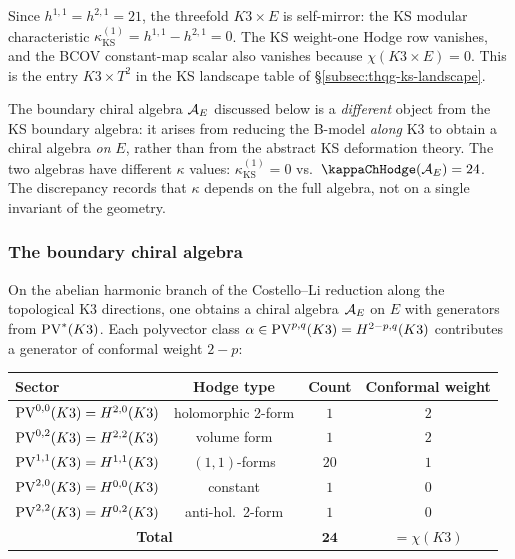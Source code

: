 \begin{remark}[Self-mirror with $\kappa_{\mathrm{KS}}^{(1)} = 0$]
\label{rem:k3e-self-mirror}
Since $h^{1,1} = h^{2,1} = 21$, the threefold $K3 \times E$
is self-mirror: the KS modular characteristic
$\kappa_{\mathrm{KS}}^{(1)} = h^{1,1} - h^{2,1} = 0$.
The KS weight-one Hodge row vanishes, and the BCOV constant-map
scalar also vanishes because $\chi(K3\times E)=0$. This is the entry
$K3 \times T^2$ in the KS landscape table of
\S\ref*{subsec:thqg-ks-landscape}.

The boundary chiral algebra $\mathcal{A}_E$ discussed below is a
\emph{different} object from the KS boundary algebra: it arises
from reducing the B-model \emph{along} K3 to obtain a chiral
algebra \emph{on} $E$, rather than from the abstract KS
deformation theory. The two algebras have different $\kappa$
values: $\kappa_{\mathrm{KS}}^{(1)} = 0$ vs.\
$\kappaChHodge(\cA_E) = 24$. The discrepancy records that
$\kappa$ depends on the full algebra, not on a single
invariant of the geometry.
\end{remark}


\subsubsection{The boundary chiral algebra}
\label{subsubsec:k3e-boundary}

On the abelian harmonic branch of the Costello--Li reduction along the
topological K3 directions, one obtains a chiral algebra $\mathcal{A}_E$ on $E$
with generators from $\operatorname{PV}^*(K3)$. Each polyvector class
$\alpha \in \operatorname{PV}^{p,q}(K3) = H^{2-p,q}(K3)$ contributes a generator of
conformal weight $2 - p$:

\begin{center}
\renewcommand{\arraystretch}{1.2}
\small
\begin{tabular}{lccc}
\textbf{Sector} & \textbf{Hodge type} & \textbf{Count}
 & \textbf{Conformal weight} \\
\hline
$\operatorname{PV}^{0,0}(K3) = H^{2,0}(K3)$ & holomorphic 2-form & $1$ & $2$ \\
$\operatorname{PV}^{0,2}(K3) = H^{2,2}(K3)$ & volume form & $1$ & $2$ \\
$\operatorname{PV}^{1,1}(K3) = H^{1,1}(K3)$ & $(1{,}1)$-forms & $20$ & $1$ \\
$\operatorname{PV}^{2,0}(K3) = H^{0,0}(K3)$ & constant & $1$ & $0$ \\
$\operatorname{PV}^{2,2}(K3) = H^{0,2}(K3)$ & anti-hol.\ 2-form & $1$ & $0$ \\
\hline
\multicolumn{2}{c}{\textbf{Total}} & $\mathbf{24}$
 & $= \chi(K3)$
\end{tabular}
\end{center}

